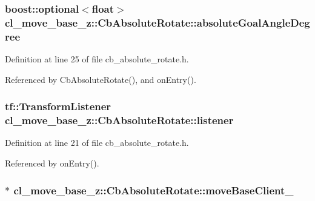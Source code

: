 \subsubsection[{\texorpdfstring{absolute\+Goal\+Angle\+Degree}{absoluteGoalAngleDegree}}]{\setlength{\rightskip}{0pt plus 5cm}boost\+::optional$<$float$>$ cl\+\_\+move\+\_\+base\+\_\+z\+::\+Cb\+Absolute\+Rotate\+::absolute\+Goal\+Angle\+Degree}\hypertarget{classcl__move__base__z_1_1CbAbsoluteRotate_ad5d0e21549940444e1cb525cda73329a}{}\label{classcl__move__base__z_1_1CbAbsoluteRotate_ad5d0e21549940444e1cb525cda73329a}


Definition at line 25 of file cb\+\_\+absolute\+\_\+rotate.\+h.



Referenced by Cb\+Absolute\+Rotate(), and on\+Entry().

\subsubsection[{\texorpdfstring{listener}{listener}}]{\setlength{\rightskip}{0pt plus 5cm}tf\+::\+Transform\+Listener cl\+\_\+move\+\_\+base\+\_\+z\+::\+Cb\+Absolute\+Rotate\+::listener}\hypertarget{classcl__move__base__z_1_1CbAbsoluteRotate_ad946bb6486dc35baf03ec1cc430a3406}{}\label{classcl__move__base__z_1_1CbAbsoluteRotate_ad946bb6486dc35baf03ec1cc430a3406}


Definition at line 21 of file cb\+\_\+absolute\+\_\+rotate.\+h.



Referenced by on\+Entry().

\subsubsection[{\texorpdfstring{move\+Base\+Client\+\_\+}{moveBaseClient_}}]{$\ast$ cl\+\_\+move\+\_\+base\+\_\+z\+::\+Cb\+Absolute\+Rotate\+::move\+Base\+Client\+\_\+}\hypertarget{classcl__move__base__z_1_1CbAbsoluteRotate_a8ddbef73316ff96f30493b28b5627e35}{}\label{classcl__move__base__z_1_1CbAbsoluteRotate_a8ddbef73316ff96f30493b28b5627e35}


